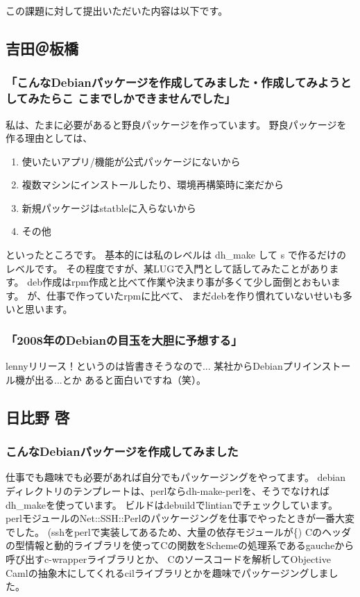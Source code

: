 \documentclass[mingoth,a4paper]{jsarticle}
\begin{document}
この課題に対して提出いただいた内容は以下です。

\subsection{吉田＠板橋}

\subsubsection{「こんなDebianパッケージを作成してみました・作成してみようとしてみたらこ
こまでしかできませんでした」}
私は、たまに必要があると野良パッケージを作っています。
野良パッケージを作る理由としては、
\begin{enumerate}
 \item 	 使いたいアプリ/機能が公式パッケージにないから
 \item	 複数マシンにインストールしたり、環境再構築時に楽だから
 \item	 新規パッケージはstatbleに入らないから
 \item	 その他
\end{enumerate}
といったところです。
基本的には私のレベルは dh\_make して s で作るだけのレベルです。
その程度ですが、某LUGで入門として話してみたことがあります。
deb作成はrpm作成と比べて作業や決まり事が多くて少し面倒とおもいます。
が、仕事で作っていたrpmに比べて、
まだdebを作り慣れていないせいも多いと思います。

\subsubsection{「2008年のDebianの目玉を大胆に予想する」}
lennyリリース！というのは皆書きそうなので...
某社からDebianプリインストール機が出る...とか
あると面白いですね（笑）。

\subsection{日比野 啓}

\subsubsection{こんなDebianパッケージを作成してみました}

仕事でも趣味でも必要があれば自分でもパッケージングをやってます。
debianディレクトリのテンプレートは、perlならdh-make-perlを、そうでなければdh\_makeを使っています。
ビルドはdebuildでlintianでチェックしています。
perlモジュールのNet::SSH::Perlのパッケージングを仕事でやったときが一番大変でした。
(sshをperlで実装してあるため、大量の依存モジュールが^^;)
Cのヘッダの型情報と動的ライブラリを使ってCの関数をSchemeの処理系であるgaucheから呼び出すc-wrapperライブラリとか、
Cのソースコードを解析してObjective Camlの抽象木にしてくれるcilライブラリとかを趣味でパッケージングしました。
\end{document}

